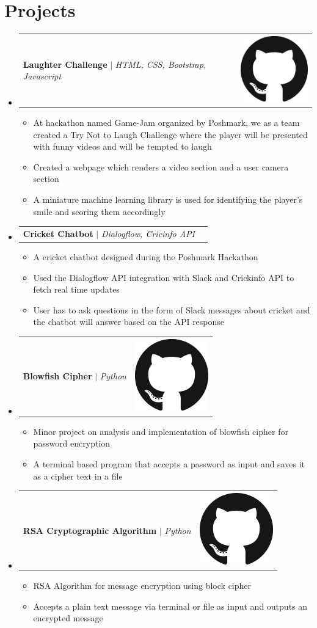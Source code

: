 \documentclass[letterpaper,11pt]{article}
\makeatletter
\newcommand{\resumeItem}[1]{
  \item\small{
    {#1 \vspace{-2pt}}
  }
}
\newcommand{\resumeProjectHeading}[2]{
    \item
    \begin{tabular*}{0.97\textwidth}{l@{\extracolsep{\fill}}r}
      \small#1 & #2 \\
    \end{tabular*}\vspace{-7pt}
}
\newcommand{\resumeSubHeadingListStart}{\begin{itemize}[leftmargin=0.15in, label={}]}
\newcommand{\resumeSubHeadingListEnd}{\end{itemize}}
\newcommand{\resumeItemListStart}{\begin{itemize}}
\newcommand{\resumeItemListEnd}{\end{itemize}\vspace{-5pt}}
\makeatother
\begin{document}
\section{Projects}
\resumeSubHeadingListStart
  \resumeProjectHeading
      {\textbf{Laughter Challenge} $|$ \emph{HTML, CSS, Bootstrap, Javascript}}{\href{https://github.com/harshmandalgi/laugh-challenge}{\includegraphics[scale=0.10]{github.png}}}
      \resumeItemListStart
        \resumeItem{At hackathon named Game-Jam organized by Poshmark, we as a team created a Try Not to Laugh Challenge where the player will be presented with funny videos and will be tempted to laugh}
        \resumeItem{Created a webpage which renders a video section and a user camera section}
        \resumeItem{A miniature machine learning library is used for identifying the player’s smile and scoring them accordingly}
      \resumeItemListEnd
  \resumeProjectHeading
      {\textbf{Cricket Chatbot} $|$ \emph{Dialogflow, Cricinfo API}}{}
      \resumeItemListStart
        \resumeItem{A cricket chatbot designed during the Poshmark Hackathon}
        \resumeItem{Used the Dialogflow API integration with Slack and Crickinfo API to fetch real time updates}
        \resumeItem{User has to ask questions in the form of Slack messages about cricket and the chatbot will answer based on the API response}
      \resumeItemListEnd
  \resumeProjectHeading
      {\textbf{Blowfish Cipher} $|$ \emph{Python}}{\href{https://github.com/iamibi/Blowfish-Cipher}{\includegraphics[scale=0.10]{github.png}}}
      \resumeItemListStart
        \resumeItem{Minor project on analysis and implementation of blowfish cipher for password encryption}
        \resumeItem{A terminal based program that accepts a password as input and saves it as a cipher text in a file}
      \resumeItemListEnd
  \resumeProjectHeading
      {\textbf{RSA Cryptographic Algorithm} $|$ \emph{Python}}{\href{https://github.com/iamibi/RSA-Cryptographic-Algorithm}{\includegraphics[scale=0.10]{github.png}}}
      \resumeItemListStart
        \resumeItem{RSA Algorithm for message encryption using block cipher}
        \resumeItem{Accepts a plain text message via terminal or file as input and outputs an encrypted message}
      \resumeItemListEnd
\resumeSubHeadingListEnd
\end{document}
